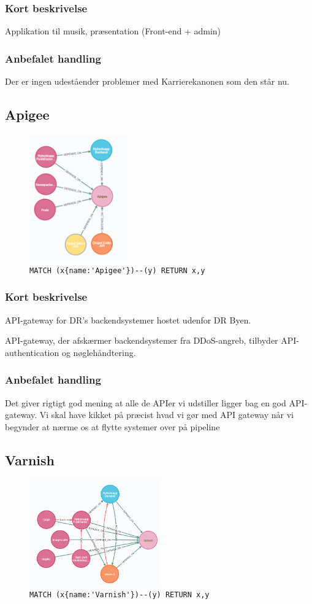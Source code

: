 \documentclass{article}
\begin{document}
\subsubsection*{Kort beskrivelse}
Applikation til musik, præsentation (Front-end + admin)
\subsubsection*{Anbefalet handling}
Der er ingen udeståender problemer med Karrierekanonen som den står nu.


\subsection{Apigee}
\begin{figure}[H]
\includegraphics[width=120pt]{Apigee.PNG}
\cprotect\caption{\verb|MATCH (x{name:'Apigee'})--(y) RETURN x,y|}
\end{figure}
\subsubsection*{Kort beskrivelse}
API-gateway for DR's backendsystemer hostet udenfor DR Byen.

API-gateway, der afskærmer backendsystemer fra DDoS-angreb, tilbyder API-authentication og nøglehåndtering.
\subsubsection*{Anbefalet handling}
Det giver rigtigt god mening at alle de APIer vi udstiller ligger bag en god API-gateway. Vi skal have kikket på præcist hvad vi gør med API gateway når vi begynder at nærme os at flytte systemer over på pipeline


\subsection{Varnish}
\begin{figure}[H]
\includegraphics[width=160pt]{Varnish.PNG}
\cprotect\caption{\verb|MATCH (x{name:'Varnish'})--(y) RETURN x,y|}
\end{figure}
\end{document}
